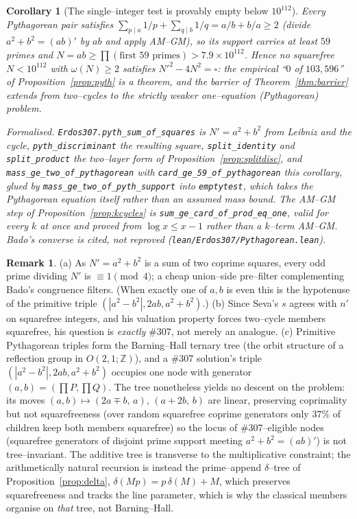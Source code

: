 \documentclass[11pt]{article}
\newtheorem{corollary}[theorem]{Corollary}
\theoremstyle{definition}
\newtheorem{remark}[theorem]{Remark}
\begin{document}
\begin{corollary}[The single--integer test is provably empty below $10^{112}$]\label{cor:emptytest}
Every Pythagorean pair satisfies $\sum_{p\mid a}1/p+\sum_{q\mid b}1/q=a/b+b/a\ge2$ (divide
$a^2+b^2=(ab)'$ by $ab$ and apply AM--GM), so its support carries at least $59$ primes and
$N=ab\ge\prod(\text{first }59\text{ primes})>7.9\times10^{112}$. Hence no squarefree $N<10^{112}$ with
$\omega(N)\ge2$ satisfies $N'^2-4N^2=\square$: the empirical ``$0$ of $103{,}596$'' of
Proposition~\ref{prop:pyth} is a theorem, and the barrier of Theorem~\ref{thm:barrier} extends from
two--cycles to the strictly weaker one--equation (Pythagorean) problem.

\textup{Formalised.} \texttt{Erdos307.pyth\_sum\_of\_squares} is $N'=a^2+b^2$ from Leibniz and the
cycle, \texttt{pyth\_discriminant} the resulting square, \texttt{split\_identity} and
\texttt{split\_product} the two--layer form of Proposition~\ref{prop:splitdisc}, and
\texttt{mass\_ge\_two\_of\_pythagorean} with \texttt{card\_ge\_59\_of\_pythagorean} this corollary,
glued by \texttt{mass\_ge\_two\_of\_pyth\_support} into \texttt{emptytest}, which takes the
Pythagorean equation itself rather than an assumed mass bound.
The AM--GM step of Proposition~\ref{prop:kcycles} is \texttt{sum\_ge\_card\_of\_prod\_eq\_one}, valid
for every $k$ at once and proved from $\log x\le x-1$ rather than a $k$--term AM--GM. Bado's converse
is cited, not reproved \textup{(\texttt{lean/Erdos307/Pythagorean.lean})}.
\end{corollary}

\begin{remark}
(a) As $N'=a^2+b^2$ is a sum of two coprime squares, every odd prime dividing $N'$ is
$\equiv1\pmod4$; a cheap union--side pre--filter complementing Bado's congruence filters. (When
exactly one of $a,b$ is even this is the hypotenuse of the primitive triple $(|a^2-b^2|,2ab,a^2+b^2)$.)
(b) Since Seva's $s$ agrees with $n'$ on squarefree integers, and his valuation property forces
two--cycle members squarefree, his question is \emph{exactly} \#307, not merely an analogue.
(c) Primitive Pythagorean triples form the Barning--Hall ternary tree (the orbit structure of a
reflection group in $O(2,1;\mathbb{Z})$), and a \#307 solution's triple $(|a^2-b^2|,2ab,a^2+b^2)$
occupies one node with generator $(a,b)=(\prod P,\prod Q)$. The tree nonetheless yields no descent on
the problem: its moves $(a,b)\mapsto(2a\mp b,\,a),\,(a+2b,\,b)$ are linear, preserving coprimality but
not squarefreeness (over random squarefree coprime generators only $37\%$ of children keep both
members squarefree) so the locus of \#307--eligible nodes (squarefree generators of disjoint prime
support meeting $a^2+b^2=(ab)'$) is not tree--invariant. The additive tree is transverse to the
multiplicative constraint; the arithmetically natural recursion is instead the prime--append
$\delta$--tree of Proposition~\ref{prop:delta}, $\delta(Mp)=p\,\delta(M)+M$, which preserves
squarefreeness and tracks the line parameter, which is why the classical members organise on
\emph{that} tree, not Barning--Hall.
\end{remark}
\end{document}
